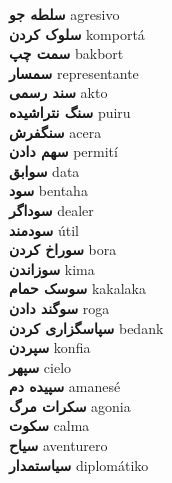 \textbf{ سلطه جو  } agresivo \\
\textbf{ سلوک کردن  } komportá \\
\textbf{ سمت چپ  } bakbort \\
\textbf{ سمسار  } representante \\
\textbf{ سند رسمی  } akto \\
\textbf{ سنگ نتراشیده  } puiru \\
\textbf{ سنگفرش  } acera \\
\textbf{ سهم دادن  } permití \\
\textbf{ سوابق  } data \\
\textbf{ سود  } bentaha \\
\textbf{ سوداگر  } dealer \\
\textbf{ سودمند  } útil \\
\textbf{ سوراخ کردن  } bora \\
\textbf{ سوزاندن  } kima \\
\textbf{ سوسک حمام  } kakalaka \\
\textbf{ سوگند دادن  } roga \\
\textbf{ سپاسگزاری کردن  } bedank \\
\textbf{ سپردن  } konfia \\
\textbf{ سپهر  } cielo \\
\textbf{ سپیده دم  } amanesé \\
\textbf{ سکرات مرگ  } agonia \\
\textbf{ سکوت  } calma \\
\textbf{ سیاح  } aventurero \\
\textbf{ سیاستمدار  } diplomátiko \\
